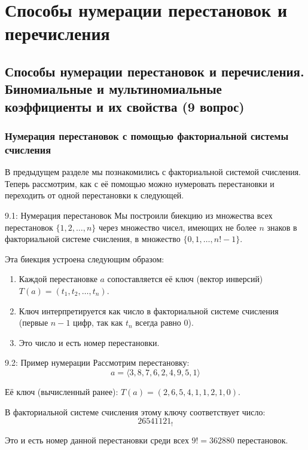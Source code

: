 \documentclass[a4paper,12pt]{article}
\begin{document}
	
	
	
	
	
	
	
	
	
	
	
	
	
	
	
	
	
	
	\newpage
	\section{Способы нумерации перестановок и перечисления}
	
	\subsection{Способы нумерации перестановок и перечисления. Биномиальные и мультиномиальные коэффициенты и их свойства (9 вопрос)}
	
	\subsubsection{Нумерация перестановок с помощью факториальной системы счисления}
	
	В предыдущем разделе мы познакомились с факториальной системой счисления. Теперь рассмотрим, как с её помощью можно нумеровать перестановки и переходить от одной перестановки к следующей.
	
	\begin{definitionbox}{9.1: Нумерация перестановок}
		Мы построили биекцию из множества всех перестановок $\{1,2,\dots,n\}$ через множество чисел, имеющих не более $n$ знаков в факториальной системе счисления, в множество $\{0, 1, \dots, n!-1\}$.
		
		Эта биекция устроена следующим образом:
		\begin{enumerate}
			\item Каждой перестановке $a$ сопоставляется её ключ (вектор инверсий) $T(a) = (t_1, t_2, \dots, t_n)$.
			\item Ключ интерпретируется как число в факториальной системе счисления (первые $n-1$ цифр, так как $t_n$ всегда равно 0).
			\item Это число и есть номер перестановки.
		\end{enumerate}
	\end{definitionbox}
	
	\begin{examplebox}{9.2: Пример нумерации}
		Рассмотрим перестановку:
		\[ a = \langle 3, 8, 7, 6, 2, 4, 9, 5, 1 \rangle \]
		
		Её ключ (вычисленный ранее): $T(a) = (2, 6, 5, 4, 1, 1, 2, 1, 0)$.
		
		В факториальной системе счисления этому ключу соответствует число:
		\[ 26541121_{!} \]
		
		Это и есть номер данной перестановки среди всех $9! = 362880$ перестановок.
	\end{examplebox}
	
\end{document}
